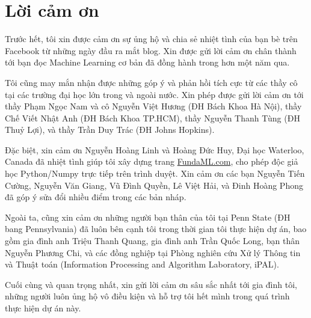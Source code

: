 



\section{Lời cảm ơn}
Trước hết, tôi xin được cảm ơn sự ủng hộ và chia sẻ nhiệt tình của bạn bè trên  Facebook từ những ngày đầu ra mắt blog. Xin được gửi lời cảm ơn chân thành tới bạn đọc Machine Learning cơ bản đã đồng hành trong hơn một năm qua. 

Tôi cũng may mắn nhận được những góp ý và phản hồi tích cực từ các thầy cô
tại các trường đại học lớn trong và ngoài nước. Xin phép được gửi lời cảm ơn
tới thầy Phạm Ngọc Nam và cô Nguyễn Việt Hương (ĐH Bách Khoa Hà Nội), thầy Chế
Viết Nhật Anh (ĐH Bách Khoa TP.HCM), thầy Nguyễn Thanh Tùng (ĐH Thuỷ Lợi),
và thầy Trần Duy Trác (ĐH Johns Hopkins).

Đặc biệt, xin cảm ơn Nguyễn Hoàng Linh và Hoàng Đức Huy, Đại học Waterloo,
Canada đã nhiệt tình giúp tôi xây dựng trang \url{FundaML.com}, cho phép độc giả
 học Python/Numpy trực tiếp trên trình duyệt. Xin cảm ơn các bạn Nguyễn
Tiến Cường, Nguyễn Văn Giang, Vũ Đình Quyền, Lê Việt Hải, và Đinh Hoàng Phong đã
góp ý sửa đổi nhiều điểm trong các bản nháp.

Ngoài ta, cũng xin cảm ơn những người bạn thân của tôi tại Penn State
(ĐH bang Pennsylvania) đã luôn bên cạnh tôi trong thời gian tôi thực hiện dự án,
bao gồm gia đình anh Triệu Thanh Quang, gia đình anh Trần Quốc Long, bạn thân
Nguyễn Phương Chi, và các đồng nghiệp tại Phòng nghiên cứu Xử lý Thông tin và
Thuật toán (Information Processing and Algorithm Laboratory, iPAL).

Cuối cùng và quan trọng nhất, xin gửi lời cảm ơn sâu sắc nhất tới gia đình tôi,
những người luôn ủng hộ vô điều kiện và hỗ trợ tôi hết mình trong quá trình thực
hiện dự án này.





